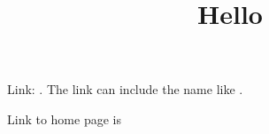 \documentclass[10pt]{article}
\begin{document}
\title{Hello}
\maketitle






Link: .  The link can include the name like
.

Link to home page is \eczoo{}
\end{document}
